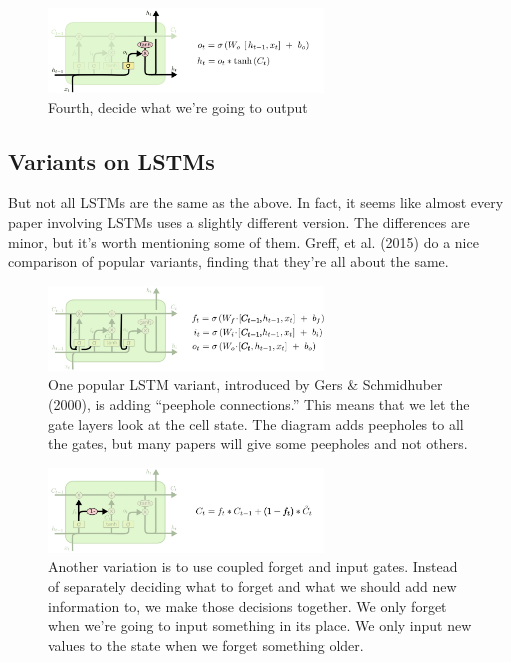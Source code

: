 \documentclass{article}
\begin{document}
	\begin{figure}[h]
		\centering
		\includegraphics[width=0.65\textwidth]{Images/recurrent_neural_networks/23.png}
		\caption{Fourth, decide what we’re going to output}
	\end{figure}
	
	\subsection{Variants on LSTMs}
	But not all LSTMs are the same as the above. In fact, it seems like almost every paper involving LSTMs uses a slightly different version. The differences are minor, but it’s worth mentioning some of them. Greff, et al. (2015) do a nice comparison of popular variants, finding that they’re all about the same.
	
	\begin{figure}[h]
		\centering
		\includegraphics[width=0.65\textwidth]{Images/recurrent_neural_networks/25.png}
		\caption{One popular LSTM variant, introduced by Gers \& Schmidhuber (2000), is adding ``peephole connections.” This means that we let the gate layers look at the cell state. The diagram adds peepholes to all the gates, but many papers will give some peepholes and not others.}
	\end{figure}
	
	\begin{figure}[h]
		\centering
		\includegraphics[width=0.65\textwidth]{Images/recurrent_neural_networks/26.png}
		\caption{Another variation is to use coupled forget and input gates. Instead of separately deciding what to forget and what we should add new information to, we make those decisions together. We only forget when we’re going to input something in its place. We only input new values to the state when we forget something older.}
	\end{figure}
	
\end{document}

